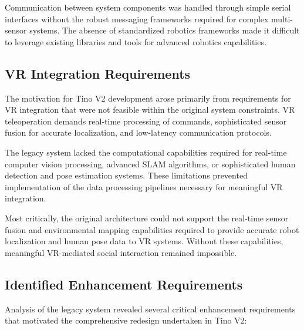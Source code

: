 Communication between system components was handled through simple serial interfaces without the robust messaging frameworks required for complex multi-sensor systems. The absence of standardized robotics frameworks made it difficult to leverage existing libraries and tools for advanced robotics capabilities.

\subsection{VR Integration Requirements}
The motivation for Tino V2 development arose primarily from requirements for VR integration that were not feasible within the original system constraints. VR teleoperation demands real-time processing of commands, sophisticated sensor fusion for accurate localization, and low-latency communication protocols.

The legacy system lacked the computational capabilities required for real-time computer vision processing, advanced SLAM algorithms, or sophisticated human detection and pose estimation systems. These limitations prevented implementation of the data processing pipelines necessary for meaningful VR integration.

Most critically, the original architecture could not support the real-time sensor fusion and environmental mapping capabilities required to provide accurate robot localization and human pose data to VR systems. Without these capabilities, meaningful VR-mediated social interaction remained impossible.

\subsection{Identified Enhancement Requirements}
Analysis of the legacy system revealed several critical enhancement requirements that motivated the comprehensive redesign undertaken in Tino V2:

